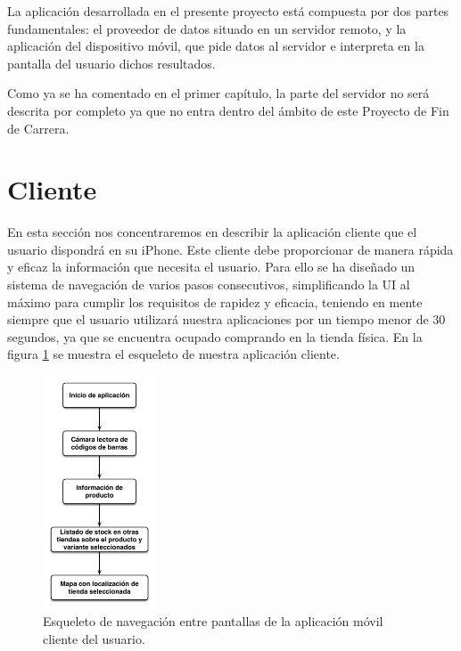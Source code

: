 
La aplicación desarrollada en el presente proyecto está compuesta por dos partes fundamentales: el proveedor de datos situado en un servidor remoto, y la aplicación del dispositivo móvil, que pide datos al servidor e interpreta en la pantalla del usuario dichos resultados.

Como ya se ha comentado en el primer capítulo, la parte del servidor no será descrita por completo ya que no entra dentro del ámbito de este Proyecto de Fin de Carrera.

\section{Cliente}
En esta sección nos concentraremos en describir la aplicación cliente que el usuario dispondrá en su iPhone. Este cliente debe proporcionar de manera rápida y eficaz la información que necesita el usuario. Para ello se ha diseñado un sistema de navegación de varios pasos consecutivos, simplificando la UI al máximo para cumplir los requisitos de rapidez y eficacia, teniendo en mente siempre que el usuario utilizará nuestra aplicaciones por un tiempo menor de 30 segundos, ya que se encuentra ocupado comprando en la tienda física. En la figura \ref{fig:esqueleto} se muestra el esqueleto de nuestra aplicación cliente.

\begin{figure}[h]
	\centering
		\includegraphics[width=0.3\textwidth]{./img/esqueleto-app.png}
	\caption{Esqueleto de navegación entre pantallas de la aplicación móvil cliente del usuario.}
	\label{fig:esqueleto}
\end{figure}

